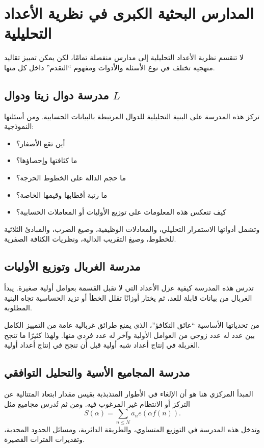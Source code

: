 \section{المدارس البحثية الكبرى في نظرية الأعداد التحليلية}

لا تنقسم نظرية الأعداد التحليلية إلى مدارس منفصلة تمامًا، لكن يمكن تمييز تقاليد منهجية تختلف في نوع الأسئلة والأدوات ومفهوم ``التقدم'' داخل كل منها.

\subsection{مدرسة دوال زيتا ودوال \(L\)}

تركز هذه المدرسة على البنية التحليلية للدوال المرتبطة بالبيانات الحسابية. ومن أسئلتها النموذجية:

\begin{itemize}
  \item أين تقع الأصفار؟
  \item ما كثافتها وإحصاؤها؟
  \item ما حجم الدالة على الخطوط الحرجة؟
  \item ما رتبة أقطابها وقيمها الخاصة؟
  \item كيف تنعكس هذه المعلومات على توزيع الأوليات أو المعاملات الحسابية؟
\end{itemize}

وتشمل أدواتها الاستمرار التحليلي، والمعادلات الوظيفية، وصيغ الضرب، والمبادئ الثلاثية للخطوط، وصيغ التقريب الدالية، ونظريات الكثافة الصفرية.

\subsection{مدرسة الغربال وتوزيع الأوليات}

تدرس هذه المدرسة كيفية عزل الأعداد التي لا تقبل القسمة بعوامل أولية صغيرة. يبدأ الغربال من بيانات قابلة للعد، ثم يختار أوزانًا تقلل الخطأ أو تزيد الحساسية تجاه البنية المطلوبة.

من تحدياتها الأساسية ``عائق التكافؤ''، الذي يمنع طرائق غربالية عامة من التمييز الكامل بين عدد له عدد زوجي من العوامل الأولية وآخر له عدد فردي منها. ولهذا كثيرًا ما تنجح الغربلة في إنتاج أعداد شبه أولية قبل أن تنجح في إنتاج أعداد أولية.

\subsection{مدرسة المجاميع الأسية والتحليل التوافقي}

المبدأ المركزي هنا هو أن الإلغاء في الأطوار المتذبذبة يقيس مقدار ابتعاد المتتالية عن التركز أو الانتظام غير المرغوب فيه. ومن ثم تُدرس مجاميع مثل
\[
S(\alpha)=\sum_{n\leq N} a_n e(\alpha f(n)).
\]
وتدخل هذه المدرسة في التوزيع المتساوي، والطريقة الدائرية، ومسائل الحدود المحدبة، وتقديرات الفترات القصيرة.

